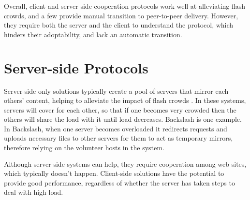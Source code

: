Overall, client and server side cooperation protocols work well at alleviating flash crowds, and a few provide manual transition to peer-to-peer delivery.  
However, they require both the server and the client to understand the protocol, which hinders their adoptability, and lack an automatic transition.

\section{Server-side Protocols}

Server-side only solutions typically create a pool of servers that mirror each others' content, helping to alleviate the impact of flash crowds \cite{backslash, dotSlash}.  
In these systems, servers will cover for each other, so that if one becomes very crowded then the others will share the load with it until load decreases.  Backslash \cite{backslash} is one example.  In Backslash, when one server becomes overloaded it redirects requests and uploads necessary files to other servers for them to act as temporary mirrors, therefore relying on the volunteer hosts in the system.  

Although server-side systems can help, they require cooperation among web sites, which typically doesn't happen.  Client-side solutions have the potential to provide good
performance, regardless of whether the server has taken steps to deal with high load.

